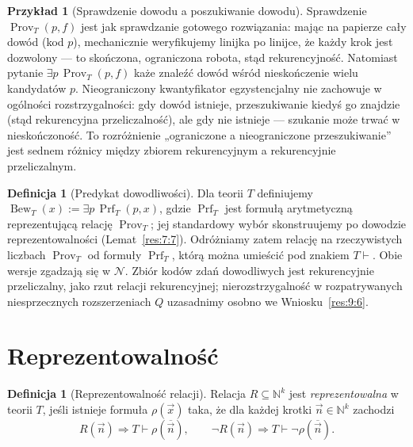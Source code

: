 \documentclass[11pt,a4paper]{article}
\numberwithin{equation}{section}
\newcommand{\N}{\mathbb N}
\theoremstyle{plain}
\theoremstyle{definition}
\newtheorem{definicja}[twierdzenie]{Definicja}
\newtheorem{przyklad}[twierdzenie]{Przykład}
\theoremstyle{remark}
\begin{document}
\begin{przyklad}[Sprawdzenie dowodu a poszukiwanie dowodu]\label{res:6:6}
Sprawdzenie $\operatorname{Prov}_T(p,f)$ jest jak sprawdzanie gotowego rozwiązania: mając na papierze cały dowód (kod $p$), mechanicznie weryfikujemy linijka po linijce, że każdy krok jest dozwolony --- to skończona, ograniczona robota, stąd rekurencyjność. Natomiast pytanie $\exists p\,\operatorname{Prov}_T(p,f)$ każe znaleźć dowód wśród nieskończenie wielu kandydatów $p$. Nieograniczony kwantyfikator egzystencjalny nie zachowuje w ogólności rozstrzygalności: gdy dowód istnieje, przeszukiwanie kiedyś go znajdzie (stąd rekurencyjna przeliczalność), ale gdy nie istnieje --- szukanie może trwać w nieskończoność. To rozróżnienie „ograniczone a nieograniczone przeszukiwanie” jest sednem różnicy między zbiorem rekurencyjnym a rekurencyjnie przeliczalnym.
\end{przyklad}

\begin{definicja}[Predykat dowodliwości]\label{res:6:7}
Dla teorii $T$ definiujemy $\operatorname{Bew}_T(x):=\exists p\,\operatorname{Prf}_T(p,x)$, gdzie $\operatorname{Prf}_T$ jest formułą arytmetyczną reprezentującą relację $\operatorname{Prov}_T$; jej standardowy wybór skonstruujemy po dowodzie reprezentowalności (Lemat~\ref{res:7:7}). Odróżniamy zatem relację na rzeczywistych liczbach $\operatorname{Prov}_T$ od formuły $\operatorname{Prf}_T$, którą można umieścić pod znakiem $T\vdash$. Obie wersje zgadzają się w $\mathcal N$. Zbiór kodów zdań dowodliwych jest rekurencyjnie przeliczalny, jako rzut relacji rekurencyjnej; nierozstrzygalność w rozpatrywanych niesprzecznych rozszerzeniach $Q$ uzasadnimy osobno we Wniosku~\ref{res:9:6}.
\end{definicja}

\section{Reprezentowalność}\label{sec:reprezentowalnosc}

\begin{definicja}[Reprezentowalność relacji]\label{res:7:1}
Relacja $R\subseteq\N^k$ jest \emph{reprezentowalna} w teorii $T$, jeśli istnieje formuła $\rho(\vec x)$ taka, że dla każdej krotki $\vec n\in\N^k$ zachodzi
\[
R(\vec n)\Longrightarrow T\vdash\rho(\overline{\vec n}),\qquad
\neg R(\vec n)\Longrightarrow T\vdash\neg\rho(\overline{\vec n}).
\]
\end{definicja}
\end{document}

